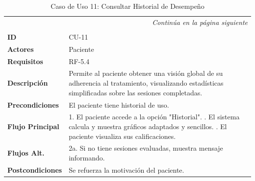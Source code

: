 \clearpage
\begin{longtable}{p{} p{}}
    \toprule
    \endfirsthead
    \toprule
    \endhead
    \midrule
    \multicolumn{2}{r}{\small\itshape Continúa en la página siguiente} \\
    \endfoot
    \bottomrule
    \noalign{\vspace{0.5cm}}
    \caption{Caso de Uso 11: Consultar Historial de Desempeño} \label{cu:11} \\
    \endlastfoot

    \textbf{ID} & CU-11 \\ \midrule
    \textbf{Actores} & Paciente \\ \midrule
    \textbf{Requisitos} & RF-5.4 \\ \midrule
    \textbf{Descripción} & Permite al paciente obtener una visión global de su adherencia al tratamiento, visualizando estadísticas simplificadas sobre las sesiones completadas. \\ \midrule
    \textbf{Precondiciones} & El paciente tiene historial de uso. \\ \midrule
    \textbf{Flujo Principal} & 
    1. El paciente accede a la opción "Historial". \newline
    2. El sistema calcula y muestra gráficos adaptados y sencillos. \newline
    3. El paciente visualiza sus calificaciones. \\ \midrule
    \textbf{Flujos Alt.} & 
    2a. Si no tiene sesiones evaluadas, muestra mensaje informando. \\ \midrule
    \textbf{Postcondiciones} & Se refuerza la motivación del paciente. \\
\end{longtable}


